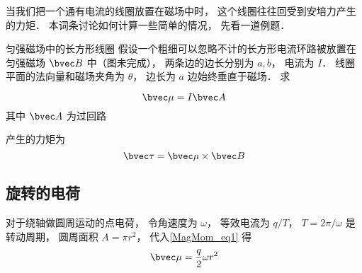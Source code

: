 

当我们把一个通有电流的线圈放置在磁场中时， 这个线圈往往回受到安培力产生的力矩． 本词条讨论如何计算一些简单的情况， 先看一道例题．

\begin{example}{匀强磁场中的长方形线圈}
假设一个粗细可以忽略不计的长方形电流环路被放置在匀强磁场 $\bvec B$ 中（图未完成）， 两条边的边长分别为 $a, b$， 电流为 $I$． 线圈平面的法向量和磁场夹角为 $\theta$， 边长为 $a$ 边始终垂直于磁场． 求
\end{example}



\begin{equation}\label{MagMom_eq1}
\bvec \mu = I \bvec A
\end{equation}
其中 $\bvec A$ 为过回路

产生的力矩为
\begin{equation}
\bvec \tau = \bvec \mu \times \bvec B
\end{equation}

\subsection{旋转的电荷}
对于绕轴做圆周运动的点电荷， 令角速度为 $\omega$， 等效电流为 $q/T$， $T = 2\pi/\omega$ 是转动周期， 圆周面积 $A = \pi r^2$， 代入\autoref{MagMom_eq1} 得
\begin{equation}
\bvec \mu = \frac{q}{2} \omega r^2
\end{equation}
